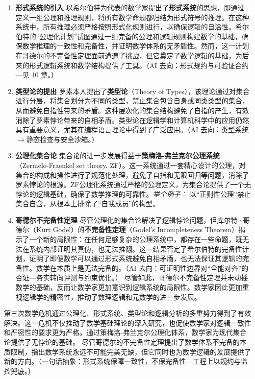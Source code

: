 \begin{enumerate}
\item {\bf 形式系统的引入}
以希尔伯特为代表的数学家提出了{\bf 形式系统}的思想，即通过定义一组公理和推理规则，将所有数学命题都归结为形式符号的推理。在这种系统中，所有推理必须严格按照形式化规则进行，以确保逻辑的自洽性。希尔伯特的“公理化计划”试图通过一组完备的公理和逻辑规则构建数学的基础，确保数学推理的一致性和完备性，并证明数学体系的无矛盾性。然而，这一计划在哥德尔的不完备性定理面前遭遇了挑战，但它奠定了数学逻辑的基础，为后来的形式逻辑系统和数学结构提供了工具。{（AI 去向：形式规约与可验证合约—见 10 章。）}
\item {\bf 类型论的提出}
罗素本人提出了{\bf 类型论}（Theory of Types），该理论通过对集合进行分层，将集合划分为不同的类型，禁止集合包含自身或同类类型的集合，从而避免自指性带来的矛盾。这种层次化的集合结构避免了自指的产生，有效消除了罗素悖论带来的自相矛盾。类型论在逻辑学和计算机科学中的应用仍然具有重要意义，尤其在编程语言理论中得到了广泛应用。{（AI 去向：类型系统$\rightarrow$静态检查与安全沙箱。）}
\item {\bf 公理化集合论}
集合论的进一步发展得益于{\bf 策梅洛-弗兰克尔公理系统}（Zermelo-Fraenkel set theory, ZF）。这一系统通过一套精心设计的公理，对集合的构成和操作进行了规范化处理，避免了自指和无限回归等问题，消除了罗素悖论的根源。ZF公理化系统通过严格的公理定义，为集合论提供了一个无悖论的逻辑基础，确保了数学推理的可靠性。{{\itshape 举个例子：} 以“正则性公理”禁止集合自含，从根本上排除了“自我成员”的构型。}
\item {\bf 哥德尔不完备性定理}
尽管公理化的集合论解决了逻辑悖论问题，但库尔特·哥德尔（Kurt Gödel）的{\bf 不完备性定理}（Gödel's Incompleteness Theorem）揭示了一个新的局限性：在任何足够复杂的公理系统中，都存在一些命题，既无法在系统内部证明其真伪，也无法推翻。这一结果否定了希尔伯特的完备性计划，证明了即便数学可以通过形式系统避免自相矛盾，也无法保证其逻辑的完备性。数学在本质上是无法完备的。{（AI 去向：可证明性边界对“全能对齐”的否证—务实转向评测与约束优化。）}
尽管如此，哥德尔不完备性定理并未动摇数学的基础，反而让数学家更加意识到逻辑系统的局限性。数学家因此更加重视逻辑学的精密性，推动了数理逻辑和元数学的进一步发展。
\end{enumerate}
第三次数学危机通过公理化、形式系统、类型论和逻辑分析的多重努力得到了有效解决。这一危机不仅推动了数学基础理论的深入研究，也促使数学家对逻辑一致性和严密性的要求更为严格。通过策梅洛-弗兰克尔公理化体系，数学家为现代集合论提供了无悖论的基础。
尽管哥德尔的不完备性定理提出了数学体系不完备的本质限制，指出数学系统永远不可能完美无缺，但它同时也为数学逻辑的发展提供了新的方向。{（一句话抽象：形式系统保障一致性，不保完备性—工程上以规约与监控兜底。）}
